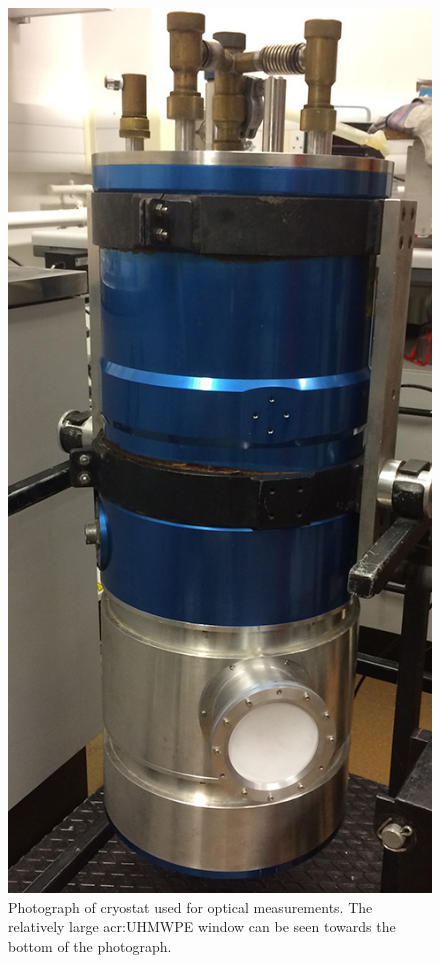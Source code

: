 \begin{figure}[tb]
\begin{center}
\includegraphics[height = 0.5\textheight]{figures/CookieMonster}
\caption[Photograph of cryostat used for optical measurements]{Photograph of cryostat used for optical measurements. The relatively large \gls{acr:UHMWPE} window can be seen towards the bottom of the photograph.}
\label{fig:CookieMonster}
\end{center}
\end{figure}

